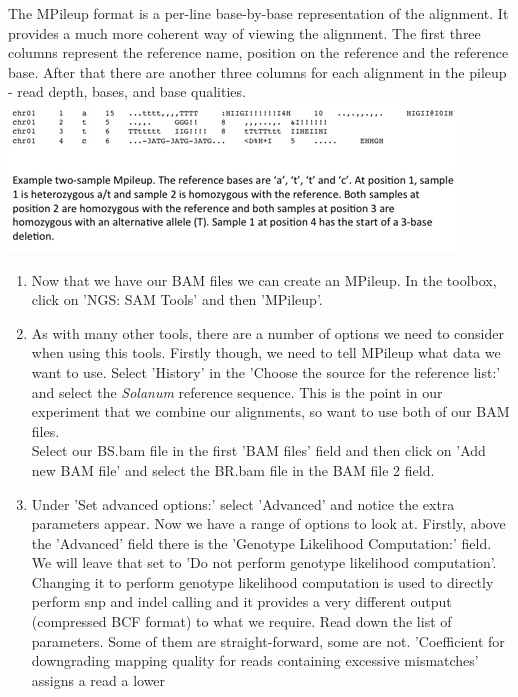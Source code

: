 \documentclass[12pt,a4paper]{article}
\begin{document}
The MPileup format is a per-line base-by-base representation of the
alignment. It provides a much more coherent way of viewing the
alignment. The first three columns represent the reference name,
position on the reference and the reference base. After that there are
another three columns for each alignment in the pileup - read depth,
bases, and base qualities.  \\
\includegraphics{images/mpileup.jpg}
\begin{enumerate}
	\item Now that we have our BAM files we can create an
          MPileup. In the toolbox, click on 'NGS: SAM Tools' and then
          'MPileup'.
	\item As with many other tools, there are a number of options
          we need to consider when using this tools. Firstly though,
          we need to tell MPileup what data we want to use. Select
          'History' in the 'Choose the source for the reference list:'
          and select the \emph{Solanum} reference sequence. This is
          the point in our experiment that we combine our alignments,
          so want to use both of our BAM files.  \\Select our BS.bam
          file in the first 'BAM files' field and then click on 'Add
          new BAM file' and select the BR.bam file in the BAM file 2
          field.
	\item Under 'Set advanced options:' select 'Advanced' and
          notice the extra parameters appear. Now we have a range of
          options to look at. Firstly, above the 'Advanced' field
          there is the 'Genotype Likelihood Computation:' field. We
          will leave that set to 'Do not perform genotype likelihood
          computation'. Changing it to perform genotype likelihood
          computation is used to directly perform snp and indel
          calling and it provides a very different output (compressed
          BCF format) to what we require. Read down the list of
          parameters. Some of them are straight-forward, some are
          not. 'Coefficient for downgrading mapping quality for reads
          containing excessive mismatches' assigns a read a lower

\end{enumerate}
\end{document}
